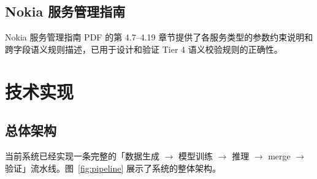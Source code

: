 \documentclass[12pt, a4paper]{article}
\begin{document}
\subsection{Nokia 服务管理指南}

Nokia 服务管理指南 PDF 的第 4.7--4.19 章节提供了各服务类型的参数约束说明和跨字段语义规则描述，已用于设计和验证 Tier 4 语义校验规则的正确性。

\section{技术实现}
\label{sec:approach}

\subsection{总体架构}

当前系统已经实现一条完整的「数据生成 $\to$ 模型训练 $\to$ 推理 $\to$ merge $\to$ 验证」流水线。图~\ref{fig:pipeline} 展示了系统的整体架构。
\end{document}
